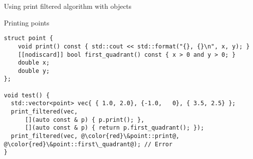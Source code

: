\begin{frame}[t,fragile]{Using print filtered algorithm with objects}
\begin{block}{Printing points}
\begin{lstlisting}[escapechar=@]
struct point {
    void print() const { std::cout << std::format("{}, {}\n", x, y); }
    [[nodiscard]] bool first_quadrant() const { x > 0 and y > 0; }
    double x;
    double y;
};

void test() {
  std::vector<point> vec{ { 1.0, 2.0}, {-1.0,   0}, { 3.5, 2.5} };
  print_filtered(vec,
      [](auto const & p) { p.print(); },
      [](auto const & p) { return p.first_quadrant(); });
  print_filtered(vec, @\color{red}\&point::print@, @\color{red}\&point::first\_quadrant@); // Error
}
\end{lstlisting}
\end{block}
\end{frame}

